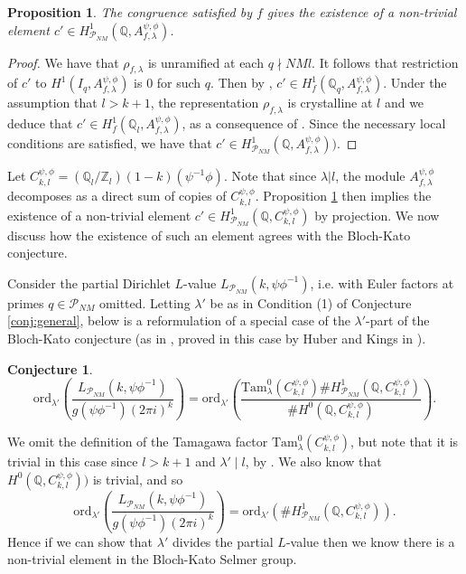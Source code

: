 \documentclass{amsart}
\theoremstyle{plain}
\newtheorem{propn}[theorem]{Proposition}
\newtheorem{conj}[theorem]{Conjecture}
\theoremstyle{definition}
\begin{document}
\begin{propn}\label{prop:BK}
    The congruence satisfied by $f$ gives the existence of a non-trivial element $c' \in H^1_{\mathcal{P}_{NM}}(\mathbb{Q}, A_{f,\lambda}^{\psi,\phi})$.
\end{propn}
\begin{proof}
    We have that $\rho_{f,\lambda}$ is unramified at each $q\nmid NMl$. It follows that restriction of $c'$ to $H^1(I_q, A_{f,\lambda}^{\psi,\phi})$ is 0 for such $q$. Then by \cite[Lemma 7.4]{brown_2007}, $c' \in H^1_f(\mathbb{Q}_q, A_{f,\lambda}^{\psi,\phi})$. Under the assumption that $l > k+1$, the representation $\rho_{f,\lambda}$ is crystalline at $l$ and we deduce that $c' \in H^1_f(\mathbb{Q}_l, A_{f,\lambda}^{\psi,\phi})$, as a consequence of \cite[Proposition 2.2]{diamond_flach_guo_2004}. Since the necessary local conditions are satisfied, we have that $c' \in H^1_{\mathcal{P}_{NM}}(\mathbb{Q}, A_{f,\lambda}^{\psi,\phi}))$.
\end{proof}

Let $C_{k,l}^{\psi,\phi} = (\mathbb{Q}_l/\mathbb{Z}_l)(1-k)(\psi^{-1}\phi)$. Note that since $\lambda|l$, the module $A_{f,\lambda}^{\psi,\phi}$ decomposes as a direct sum of copies of $C_{k,l}^{\psi,\phi}$. Proposition \ref{prop:BK} then implies the existence of a non-trivial element $c'\in H^1_{\mathcal{P}_{NM}}(\mathbb{Q},C_{k,l}^{\psi,\phi})$ by projection. We now discuss how the existence of such an element agrees with the Bloch-Kato conjecture.

Consider the partial Dirichlet $L$-value $L_{\mathcal{P}_{NM}}(k, \psi\phi^{-1})$, i.e. with Euler factors at primes $q \in \mathcal{P}_{NM}$ omitted. Letting $\lambda'$ be as in Condition (1) of Conjecture \ref{conj:general}, below is a reformulation of a special case of the $\lambda'$-part of the Bloch-Kato conjecture (as in \cite{diamond_flach_guo_2004}, proved in this case by Huber and Kings in \cite{huber_kings_2003}).

\begin{conj}
\label{conj:BK}
\[\text{ord}_{\lambda'}\left( \frac{L_{\mathcal{P}_{NM}}(k, \psi\phi^{-1})}{g(\psi\phi^{-1})(2\pi i)^k}\right)
   = \text{ord}_{\lambda'} \left( \frac{\text{Tam}^0_\lambda(C_{k,l}^{\psi,\phi}) \#H^1_{\mathcal{P}_{NM}}(\mathbb{Q},C_{k,l}^{\psi,\phi})}{\#H^0(\mathbb{Q},C_{k,l}^{\psi,\phi})} \right).\]
\end{conj}
 \noindent We omit the definition of the Tamagawa factor $\text{Tam}^0_\lambda(C_{k,l}^{\psi,\phi})$, but note that it is trivial in this case since $l > k+1$ and $\lambda' \mid l$, by \cite[Theorem 4.1.1(iii)]{bloch_kato_2007}. We also know that $H^0(\mathbb{Q},C_{k,l}^{\psi,\phi}))$ is trivial, and so \[\text{ord}_{\lambda'}\left( \frac{L_{\mathcal{P}_{NM}}(k, \psi\phi^{-1})}{g(\psi\phi^{-1})(2\pi i)^k}\right)=\text{ord}_{\lambda'}(\#H^1_{\mathcal{P}_{NM}}(\mathbb{Q},C_{k,l}^{\psi,\phi})).\] Hence if we can show that $\lambda'$ divides the partial $L$-value then we know there is a non-trivial element in the Bloch-Kato Selmer group.
\end{document}

